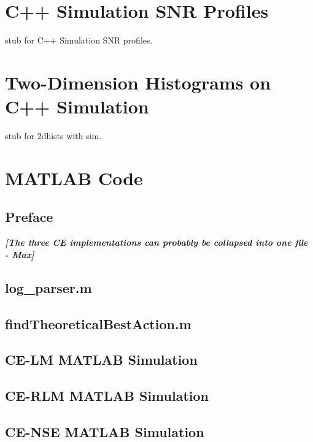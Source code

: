 
\begin{appendices}
\chapter{C++ Simulation SNR Profiles}\label{app:cSNRProfiles_all}
\par stub for C++ Simulation SNR profiles.

\chapter{Two-Dimension Histograms on C++ Simulation}\label{app:2dHistSim}
\par stub for 2dhists with sim.

\chapter{MATLAB Code}\label{app:MatlabCode}
\section{Preface}
\textit{\textbf{[The three CE implementations can probably be collapsed into one file - Max]}}
\section{log\_parser.m}\label{app:MatlabCode:parser}

\clearpage
\section{findTheoreticalBestAction.m}\label{app:MatlabCode:optimalCalc}

\clearpage
\section{CE-LM MATLAB Simulation}

\clearpage
\section{CE-RLM MATLAB Simulation}

\clearpage
\section{CE-NSE MATLAB Simulation}

\clearpage

\end{appendices}
